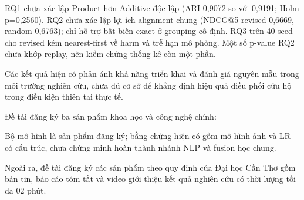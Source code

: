 RQ1 chưa xác lập Product hơn Additive độc lập (ARI 0,9072 so với 0,9191; Holm p=0,2560). RQ2 chưa xác lập lợi ích alignment chung (NDCG@5 revised 0,6669, random 0,6763); chỉ hỗ trợ bất biến exact ở grouping cố định. RQ3 trên 40 seed cho revised kém nearest-first về harm và trễ hạn mô phỏng. Một số p-value RQ2 chưa khớp replay, nên kiểm chứng thống kê còn một phần.

Các kết quả hiện có phản ánh khả năng triển khai và đánh giá nguyên mẫu trong môi trường nghiên cứu, chưa đủ cơ sở để khẳng định hiệu quả điều phối cứu hộ trong điều kiện thiên tai thực tế.

Đề tài đăng ký ba sản phẩm khoa học và công nghệ chính:
\par\noindent Bộ mô hình là sản phẩm đăng ký; bằng chứng hiện có gồm mô hình ảnh và LR có cấu trúc, chưa chứng minh hoàn thành nhánh NLP và fusion học chung.
\par\noindent Ngoài ra, đề tài đăng ký các sản phẩm theo quy định của Đại học Cần Thơ gồm bản tin, báo cáo tóm tắt và video giới thiệu kết quả nghiên cứu có thời lượng tối đa 02 phút.

